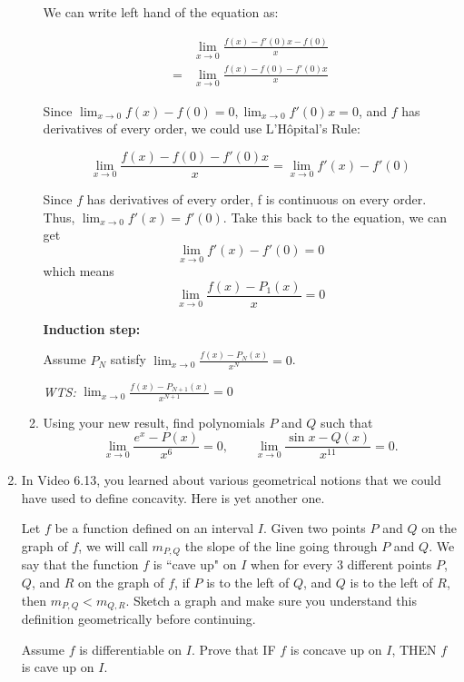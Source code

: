\documentclass[12pt]{exam}
\newcommand{\vv}{\vspace{.1cm}}
\begin{document}
\begin{enumerate}
\begin{enumerate}
			We can write left hand of the equation as:

			\begin{align*}
				&\lim_{x \to 0} \frac{f(x) - f'(0)x - f(0)}{x} \\
				=& \lim_{x \to 0} \frac{f(x) - f(0) - f'(0)x}{x}
			\end{align*}

			Since $\lim_{x \to 0}{f(x) - f(0)} = 0, \lim_{x \to 0}{f'(0)x} = 0$, and  $f$ has derivatives of every order,
			we could use L'H\^{o}pital's Rule:

			$$
				\lim_{x \to 0} \frac{f(x) - f(0) - f'(0)x}{x}
				= \lim_{x \to 0} f'(x) - f'(0)
			$$

			Since $f$ has derivatives of every order, f is continuous on every order. 
			Thus, $\lim_{x \to 0} f'(x) = f'(0)$. 
			Take this back to the equation, we can get
			$$
				\lim_{x \to 0} f'(x) - f'(0) = 0
			$$
			which means 
			$$
				\lim_{x \to 0} \frac{f(x) - P_1(x)}{x} = 0
			$$

			\textbf{Induction step:}
			
			Assume $P_N$ satisfy $\lim_{x \to 0} \frac{f(x) - P_N(x)}{x^N} = 0$.

			\emph{WTS:} $\lim_{x \to 0} \frac{f(x) - P_{N+1}(x)}{x^{N+1}} = 0$ 
			
			

		\item  Using your new result, find polynomials $P$  and $Q$ such that
			$$
				\lim_{x \to 0} \frac{e^x - P(x)}{x^6} = 0, \quad \quad \lim_{x \to 0} \frac{\sin x - Q(x)}{x^{11}} = 0.
			$$
	\end{enumerate}

\vv

\item  In Video 6.13, you learned about various geometrical notions that we could have used to define concavity.  Here is yet another one.

 Let $f$ be a function defined on an interval $I$.  Given two points $P$ and $Q$ on the graph of $f$, we will call $m_{P,Q}$ the slope of the line going through $P$ and $Q$.  We say that the function $f$ is ``cave up" on $I$ when for every 3 different points $P$, $Q$, and $R$ on the graph of $f$, if $P$ is to the left of $Q$, and $Q$ is to the left of $R$, then $m_{P,Q} < m_{Q,R}$.  Sketch a graph and make sure you understand this definition geometrically  before continuing.
 
 Assume $f$ is differentiable on $I$. 
		Prove that IF $f$ is concave up on $I$, THEN $f$ is cave up on $I$.



\end{enumerate}
\end{document}
